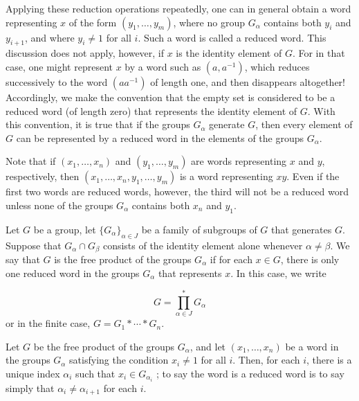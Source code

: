 Applying these reduction operations repeatedly, one can in general obtain a word representing \(x\) of the form \(( {y_{1},\ldots ,y_{m}})\), where no group \(G_{\alpha }\) contains both \(y_{i}\) and \(y_{i + 1}\), and where \(y_{i} \neq 1\) for all \(i\). Such a word is called a reduced word. This discussion does not apply, however, if \(x\) is the identity element of \(G\). For in that case, one might represent \(x\) by a word such as \(( {a,a^{-1}})\), which reduces successively to the word \(( {aa^{-1}})\) of length one, and then disappears altogether! Accordingly, we make the convention that the empty set is considered to be a reduced word (of length zero) that represents the identity element of \(G\). With this convention, it is true that if the groups \(G_{\alpha }\) generate \(G\), then every element of \(G\) can be represented by a reduced word in the elements of the groups \(G_{\alpha }\).

Note that if \(( {x_{1},\ldots ,x_{n}})\) and \(( {y_{1},\ldots ,y_{m}})\) are words representing \(x\) and \(y\), respectively, then \(( {x_{1},\ldots ,x_{n},y_{1},\ldots ,y_{m}})\) is a word representing \({xy}\). Even if the first two words are reduced words, however, the third will not be a reduced word unless none of the groups \(G_{\alpha }\) contains both \(x_{n}\) and \(y_{1}\).

\begin{definition}
Let \(G\) be a group, let \({\{ G_{\alpha }\} }_{\alpha \in J}\) be a family of subgroups of \(G\) that generates \(G\). Suppose that \(G_{\alpha } \cap {G}_{\beta }\) consists of the identity element alone whenever \(\alpha \neq \beta\). We say that \(G\) is the free product of the groups \(G_{\alpha }\) if for each \(x \in G\), there is only one reduced word in the groups \(G_{\alpha }\) that represents \(x\). In this case, we write

\[
G = \mathop{\prod }\limits_{{\alpha \in J}}^{ * }G_{\alpha }
\]
or in the finite case, \(G = G_{1} * \cdots * G_{n}\).
\end{definition}

Let \(G\) be the free product of the groups \(G_{\alpha }\), and let \(( {x_{1},\ldots ,x_{n}})\) be a word in the groups \(G_{\alpha }\) satisfying the condition \(x_{i} \neq 1\) for all \(i\). Then, for each \(i\), there is a unique index \({\alpha }_{i}\) such that \(x_{i} \in {G}_{{\alpha }_{i}}\) ; to say the word is a reduced word is to say simply that \({\alpha }_{i} \neq {\alpha }_{i + 1}\) for each \(i\).

